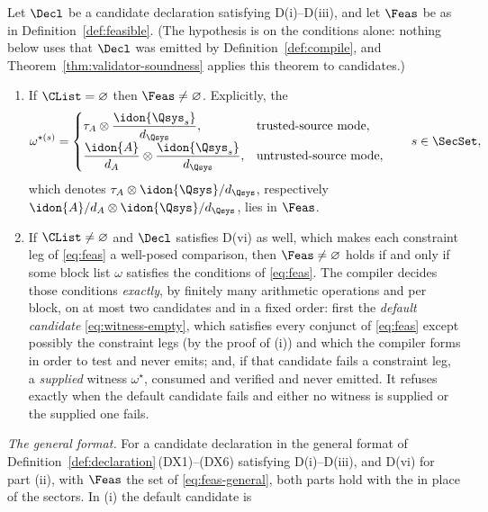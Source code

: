 \begin{theorem}\label{thm:feasibility}
Let $\Decl$ be a candidate declaration satisfying D(i)--D(iii), and let
$\Feas$ be as in Definition~\ref{def:feasible}. (The hypothesis
is on the conditions alone: nothing below uses that $\Decl$ was emitted by
Definition~\ref{def:compile}, and Theorem~\ref{thm:validator-soundness} applies this theorem to
candidates.)
\begin{enumerate}[label=(\roman*),leftmargin=2.2em]
\item If $\CList=\varnothing$ then $\Feas\ne\varnothing$. Explicitly, the
\begin{equation}\label{eq:witness-empty}
  \omega^{\star(s)}=
  \begin{cases}
    \tau_A\otimes\dfrac{\idon{\Qsys_s}}{d_{\Qsys}},
      & \text{trusted-source mode},\\[1.2ex]
    \dfrac{\idon{A}}{d_A}\otimes\dfrac{\idon{\Qsys_s}}{d_{\Qsys}},
      & \text{untrusted-source mode},
  \end{cases}
  \qquad s\in\SecSet ,
\end{equation}
which denotes $\tau_A\otimes\idon{\Qsys}/d_{\Qsys}$, respectively
$\idon{A}/d_A\otimes\idon{\Qsys}/d_{\Qsys}$, lies in $\Feas$.
\item If $\CList\ne\varnothing$ and $\Decl$ satisfies D(vi) as well, which
makes each constraint leg of \eqref{eq:feas} a well-posed comparison, then
$\Feas\ne\varnothing$ holds if and only
if some block list $\omega$ satisfies the conditions of \eqref{eq:feas}. The
compiler decides those conditions \emph{exactly}, by finitely many arithmetic
operations and per block, on at most two candidates and in a fixed order:
first the \emph{default candidate} \eqref{eq:witness-empty}, which satisfies
every conjunct of \eqref{eq:feas} except possibly the constraint legs
(by the proof of (i)) and which the compiler forms in order to test and never
emits; and, if that candidate fails a constraint leg, a \emph{supplied}
witness $\omega^{\star}$, consumed and verified and never emitted. It refuses
exactly when the default candidate fails and either no witness is supplied or
the supplied one fails.
\end{enumerate}
\emph{The general format.} For a candidate declaration in the general format
of Definition~\ref{def:declaration}\,(DX1)--(DX6) satisfying D(i)--D(iii),
and D(vi) for part (ii), with $\Feas$ the set of \eqref{eq:feas-general},
both parts hold with the
 in place of the sectors. In (i) the default candidate is

\end{theorem}
